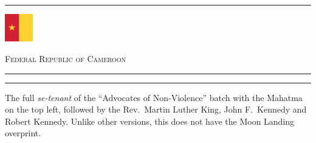 \documentclass[a4paper]{article}
\begin{document}
\hrule
\vspace{8pt}
\begin{minipage}{2cm}
  \includegraphics[height=1.2cm]{images/cm}
\end{minipage}
\hfill
{\scshape\huge Federal Republic of Cameroon}
\vspace{8pt}
\hrule
\vspace{18cm}
\begin{center}
  \begin{minipage}{10cm}
    \hrule \vspace{12pt} The full {\it se-tenant} of the ``Advocates of
    Non-Violence'' batch with the Mahatma on the top left, followed by
    the Rev.\ Martin Luther King, John F.\ Kennedy and Robert
    Kennedy. Unlike other versions, this does not have the Moon Landing
    overprint.
  \end{minipage}
\end{center}

\end{document}
